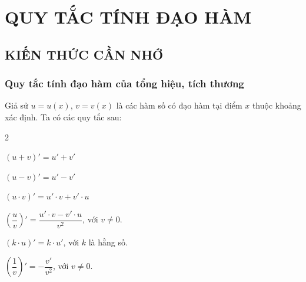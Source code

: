 \newpage
\setcounter{dang}{0}
\section{QUY TẮC TÍNH ĐẠO HÀM}
\subsection{KIẾN THỨC CẦN NHỚ}

\subsubsection{Quy tắc tính đạo hàm của tổng hiệu, tích thương}
Giả sử $u=u(x)$, $v=v(x)$ là các hàm số có đạo hàm tại điểm $x$ thuộc khoảng xác định. Ta có các quy tắc sau:
\begin{tcolorbox}[colframe=cyan,colback=red!1!white,boxrule=0.3mm]
	\begin{itemize}
	\end{itemize}
\end{tcolorbox}

